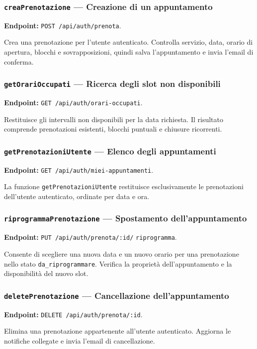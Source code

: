 \documentclass[12pt,a4paper]{article}
\begin{document}
\subsubsection{\texttt{creaPrenotazione} --- Creazione di un appuntamento}
\textbf{Endpoint:} \texttt{POST /api/auth/prenota}.

Crea una prenotazione per l'utente autenticato. Controlla servizio, data,
orario di apertura, blocchi e sovrapposizioni, quindi salva l'appuntamento e
invia l'email di conferma.

\subsubsection{\texttt{getOrariOccupati} --- Ricerca degli slot non disponibili}
\textbf{Endpoint:} \texttt{GET /api/auth/orari-occupati}.

Restituisce gli intervalli non disponibili per la data richiesta. Il risultato
comprende prenotazioni esistenti, blocchi puntuali e chiusure ricorrenti.

\subsubsection{\texttt{getPrenotazioniUtente} --- Elenco degli appuntamenti}
\textbf{Endpoint:} \texttt{GET /api/auth/miei-appuntamenti}.

La funzione \texttt{getPrenotazioniUtente} restituisce esclusivamente le
prenotazioni dell'utente autenticato, ordinate per data e ora.

\subsubsection{\texttt{riprogrammaPrenotazione} --- Spostamento dell'appuntamento}
\textbf{Endpoint:} \texttt{PUT /api/auth/prenota/:id/}\allowbreak
\texttt{riprogramma}.

Consente di scegliere una nuova data e un nuovo orario per una prenotazione
nello stato \texttt{da\_riprogrammare}. Verifica la proprietà
dell'appuntamento e la disponibilità del nuovo slot.

\subsubsection{\texttt{deletePrenotazione} --- Cancellazione dell'appuntamento}
\textbf{Endpoint:} \texttt{DELETE /api/auth/prenota/:id}.

Elimina una prenotazione appartenente all'utente autenticato. Aggiorna le
notifiche collegate e invia l'email di cancellazione.
\end{document}
